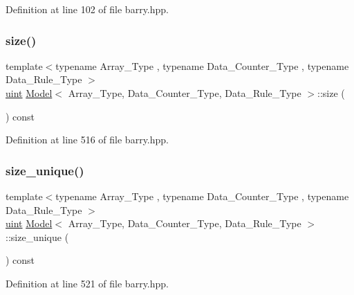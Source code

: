 Definition at line 102 of file barry.\+hpp.

\mbox{\label{classbarry_1_1_model_ab3f157dbb542a48fe5bf412ff7d467fd}} 
\subsubsection{\texorpdfstring{size()}{size()}}
{\footnotesize\ttfamily template$<$typename Array\+\_\+\+Type , typename Data\+\_\+\+Counter\+\_\+\+Type , typename Data\+\_\+\+Rule\+\_\+\+Type $>$ \\
\hyperlink{namespacebarry_a11dfc53ddb4672278319aa04f1e09a6c}{uint} \hyperlink{classbarry_1_1_model}{Model}$<$ Array\+\_\+\+Type, Data\+\_\+\+Counter\+\_\+\+Type, Data\+\_\+\+Rule\+\_\+\+Type $>$\+::size (\begin{DoxyParamCaption}{ }\end{DoxyParamCaption}) const\hspace{0.3cm}{\ttfamily [inline]}}



Definition at line 516 of file barry.\+hpp.

\mbox{\label{classbarry_1_1_model_a4b5edbe891b6da2319ea3fa6f1aba11d}} 
\subsubsection{\texorpdfstring{size\+\_\+unique()}{size\_unique()}}
{\footnotesize\ttfamily template$<$typename Array\+\_\+\+Type , typename Data\+\_\+\+Counter\+\_\+\+Type , typename Data\+\_\+\+Rule\+\_\+\+Type $>$ \\
\hyperlink{namespacebarry_a11dfc53ddb4672278319aa04f1e09a6c}{uint} \hyperlink{classbarry_1_1_model}{Model}$<$ Array\+\_\+\+Type, Data\+\_\+\+Counter\+\_\+\+Type, Data\+\_\+\+Rule\+\_\+\+Type $>$\+::size\+\_\+unique (\begin{DoxyParamCaption}{ }\end{DoxyParamCaption}) const\hspace{0.3cm}{\ttfamily [inline]}}



Definition at line 521 of file barry.\+hpp.

